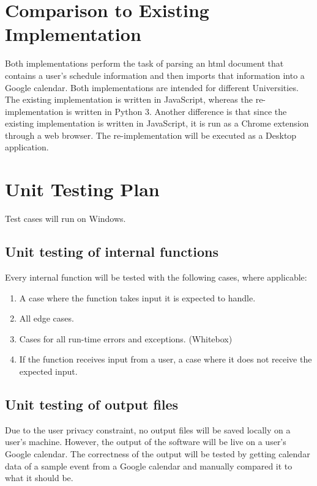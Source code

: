 \documentclass[12pt, titlepage]{article}
\begin{document}
\section{Comparison to Existing Implementation}	
Both implementations perform the task of parsing an html document that contains a user's schedule information and then imports that information into a Google calendar. Both implementations are intended for different Universities. The existing implementation is written in JavaScript, whereas the re-implementation is written in Python 3. Another difference is that since the existing implementation is written in JavaScript, it is run as a Chrome extension through a web browser. The re-implementation will be executed as a Desktop application.


\section{Unit Testing Plan}
\color{blue}Test cases will run on Windows.	\color{black}
\subsection{Unit testing of internal functions}
Every internal function will be tested with the following cases, where applicable: 

\begin{enumerate}
\item A case where the function takes input it is expected to handle. 
\item All edge cases.
\item Cases for all run-time errors and exceptions. (Whitebox)
\item If the function receives input from a user, a case where it does not receive the expected input.
\end{enumerate}
	
\subsection{Unit testing of output files}		
Due to the user privacy constraint, no output files will be saved locally on a user's machine.
However, the output of the software will be live on a user's Google calendar. The correctness of the output will be tested by getting calendar data of a sample event from a Google calendar and \color{blue} manually \color{black} compared it to what it should be. 

\newpage
\end{document}
